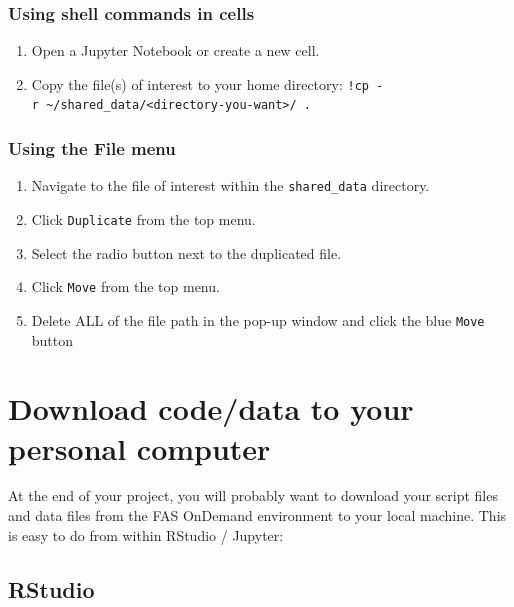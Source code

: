 \documentclass[]{book}
\providecommand{\tightlist}{%
  \setlength{\itemsep}{0pt}\setlength{\parskip}{0pt}}
\begin{document}
\hypertarget{using-shell-commands-in-cells}{%
\subsection{Using shell commands in cells}\label{using-shell-commands-in-cells}}

\begin{enumerate}
\def\labelenumi{\arabic{enumi}.}
\tightlist
\item
  Open a Jupyter Notebook or create a new cell.
\item
  Copy the file(s) of interest to your home directory: \texttt{!cp\ -r\ \textasciitilde{}/shared\_data/\textless{}directory-you-want\textgreater{}/\ .}
\end{enumerate}

\hypertarget{using-the-file-menu-1}{%
\subsection{Using the File menu}\label{using-the-file-menu-1}}

\begin{enumerate}
\def\labelenumi{\arabic{enumi}.}
\tightlist
\item
  Navigate to the file of interest within the \texttt{shared\_data} directory.
\item
  Click \texttt{Duplicate} from the top menu.
\item
  Select the radio button next to the duplicated file.
\item
  Click \texttt{Move} from the top menu.
\item
  Delete ALL of the file path in the pop-up window and click the blue \texttt{Move} button
\end{enumerate}

\hypertarget{download-codedata-to-your-personal-computer}{%
\chapter{Download code/data to your personal computer}\label{download-codedata-to-your-personal-computer}}

At the end of your project, you will probably want to download your script files and data files from the FAS OnDemand environment to your local machine. This is easy to do from within RStudio / Jupyter:

\hypertarget{rstudio-3}{%
\section{RStudio}\label{rstudio-3}}
\end{document}
